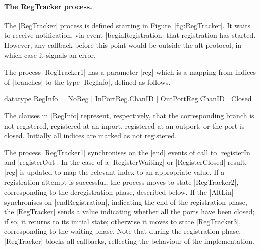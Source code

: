 


\paragraph{The {\scalashape RegTracker} process.}

The |RegTracker| process is defined starting in Figure~\ref{fig:RegTracker}.
It waits to receive notification, via event |beginRegistration| that
registration has started.  However, any callback before this point would be
outside the alt protocol, in which case it signals an error.

The process |RegTracker1| has a parameter |reg| which is a mapping from
indices of |branches| to the type |RegInfo|, defined as follows.
%
\begin{cspm}
  datatype RegInfo = NoReg | InPortReg.ChanID | OutPortReg.ChanID | Closed
\end{cspm}
%
The clauses in |RegInfo| represent, respectively, that the corresponding
branch is not registered, registered at an inport, registered at an outport,
or the port is closed.  Initially all indices are marked as not registered.

The process |RegTracker1| synchronises on the |end| events of call to
|registerIn| and |registerOut|.  In the case of a |RegisterWaiting| or
|RegisterClosed| result, |reg| is updated to map the relevant index to an
appropriate value.
%
If a registration attempt is successful, the process moves to state
|RegTracker2|, corresponding to the deregistration phase, described below.  If
the |AltLin| synchronises on |endRegistration|, indicating the end of the
registration phase, the |RegTracker| sends a value indicating whether all the
ports have been closed; if so, it returns to its initial state; otherwise it
moves to state |RegTracker3|, corresponding to the waiting phase.
%
Note that during the registration phase, |RegTracker| blocks all callbacks,
reflecting the behaviour of the implementation. 


